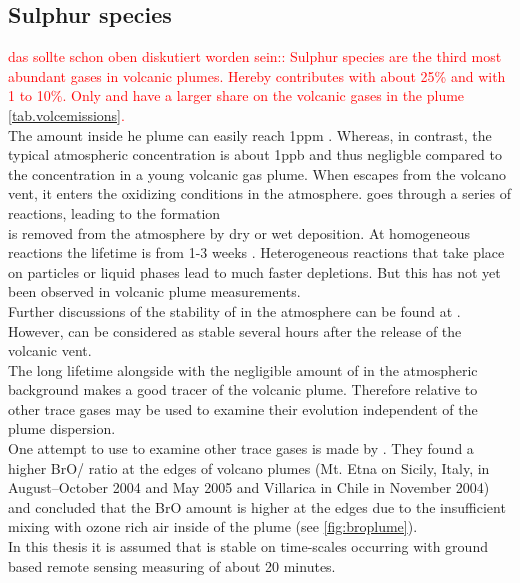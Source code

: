 \documentclass  [
  paper    = a4,
  BCOR     = 10mm,
  twoside,
  fontsize = 12pt,
  fleqn,
  toc      = bibnumbered,
  toc      = listofnumbered,
  numbers  = noendperiod,
  headings = normal,
  listof   = leveldown,
  version  = 3.03
]                                       {scrreprt}
\begin{document}
\subsection{Sulphur species\label{chap:so2}}
\textcolor{red}{das sollte schon oben diskutiert worden sein::
Sulphur species are the third most abundant gases in volcanic plumes. Hereby  contributes with about 25\% and  with 1 to 10\%. Only  and  have a larger share on the volcanic gases in the plume \cref{tab.volcemissions}.\\}
The   amount inside he plume can easily reach 1ppm \citep{oppenheimer2003volcanic}. Whereas, in contrast, the typical atmospheric concentration is about 1ppb and thus negligble compared to the concentration in a young volcanic gas plume.
When  escapes from the volcano vent, it enters the oxidizing conditions in the atmosphere.  goes through a series of reactions, leading to the  formation \citep{seinfeld2016atmospheric}\\
 is removed from the atmosphere by dry or wet
deposition. At homogeneous reactions the lifetime is from 1-3 weeks \citep{robock2000volcanic}. Heterogeneous reactions that take place on particles or liquid phases lead to much faster depletions. But this has not yet been observed in volcanic plume measurements.\\
Further discussions of the stability of   in the atmosphere can be found at \citet{lubcke2014optical}.\\
However,  can be considered as stable several hours after the release of the volcanic vent.\\ The long lifetime  alongside with the negligible amount of  in the atmospheric background makes  a good tracer of the volcanic plume.
Therefore relative to other trace gases  may be used to examine their evolution independent of the plume dispersion.\\
One attempt to use  to examine other trace gases is made by \citet{bobrowski2007reactive}. They found a higher BrO/ ratio at the edges of volcano plumes (Mt. Etna on Sicily, Italy, in August–October 2004 and May 2005 and Villarica in Chile in November 2004) and concluded that the BrO amount is higher at the edges due to the insufficient mixing with ozone rich air inside of the plume (see \cref{fig:broplume}).\\
In this thesis it is assumed that   is stable on time-scales occurring with ground based remote sensing measuring of about 20 minutes. \\
%
\end{document}
